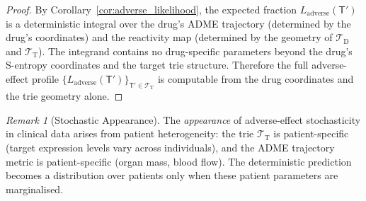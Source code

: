 \documentclass[11pt,twocolumn,a4paper]{article}
\theoremstyle{definition}
\theoremstyle{remark}
\newtheorem{remark}[theorem]{Remark}
\newcommand{\Trie}{\mathcal{T}}
\newcommand{\Dtrie}{\Trie_{\mathrm{D}}}
\newcommand{\Ttrie}{\Trie_{\mathrm{T}}}
\newcommand{\Target}{\mathsf{T}}
\begin{document}
\begin{proof}
By Corollary~\ref{cor:adverse_likelihood}, the expected fraction $L_{\mathrm{adverse}}(\Target')$ is a deterministic integral over the drug's ADME trajectory (determined by the drug's coordinates) and the reactivity map (determined by the geometry of $\Dtrie$ and $\Ttrie$). The integrand contains no drug-specific parameters beyond the drug's S-entropy coordinates and the target trie structure. Therefore the full adverse-effect profile $\{L_{\mathrm{adverse}}(\Target')\}_{\Target' \in \Ttrie}$ is computable from the drug coordinates and the trie geometry alone.
\end{proof}

\begin{remark}[Stochastic Appearance]
The \emph{appearance} of adverse-effect stochasticity in clinical data arises from patient heterogeneity: the trie $\Ttrie$ is patient-specific (target expression levels vary across individuals), and the ADME trajectory metric is patient-specific (organ mass, blood flow). The deterministic prediction becomes a distribution over patients only when these patient parameters are marginalised.
\end{remark}
\end{document}
